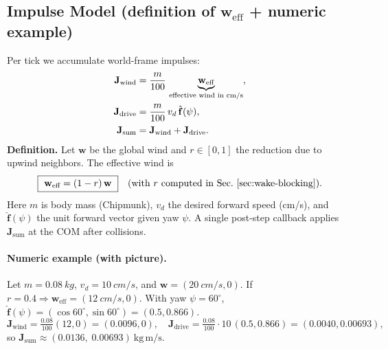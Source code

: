 \documentclass[11pt,a4paper]{article}
\newcommand{\vect}[1]{\mathbf{#1}}
\newcommand{\unitvect}[1]{\hat{\mathbf{#1}}}
\begin{document}
\subsection{Impulse Model (definition of \texorpdfstring{\(\vect{w}_{\mathrm{eff}}\)}{weff} + numeric example)}
Per tick we accumulate world-frame impulses:
\begin{align}
  \vect{J}_\text{wind}  &= \frac{m}{100}\,\underbrace{\vect{w}_\text{eff}}_{\text{effective wind in \si{cm/s}}},\\
  \vect{J}_\text{drive} &= \frac{m}{100}\,v_d\,\unitvect{f}(\psi),\\
  \vect{J}_\text{sum}   &= \vect{J}_\text{wind} + \vect{J}_\text{drive}.
\end{align}
\textbf{Definition.} Let \(\vect{w}\) be the global wind and \(r\in[0,1]\) the reduction due to upwind neighbors. The effective wind is
\[
  \boxed{\ \vect{w}_\text{eff} = (1-r)\,\vect{w}\ } \quad \text{(with \(r\) computed in Sec.~\ref{sec:wake-blocking}).}
\]
Here \(m\) is body mass (Chipmunk), \(v_d\) the desired forward speed (\si{cm/s}), and \(\unitvect{f}(\psi)\) the unit forward vector given yaw \(\psi\).
A single post-step callback applies \(\vect{J}_\text{sum}\) at the COM after collisions.

\paragraph{Numeric example (with picture).}
Let \(m=\SI{0.08}{kg}\), \(v_d=\SI{10}{cm/s}\), and \(\vect{w}=(\SI{20}{cm/s},0)\).
If \(r=0.4\Rightarrow \vect{w}_\text{eff}=(\SI{12}{cm/s},0)\).
With yaw \(\psi=60^\circ\), \(\unitvect{f}(\psi)=(\cos 60^\circ,\sin 60^\circ)=(0.5,0.866)\).
\[
\vect{J}_\text{wind}=\tfrac{0.08}{100}(12,0)=(0.0096,0),\quad
\vect{J}_\text{drive}=\tfrac{0.08}{100}\cdot10\,(0.5,0.866)=(0.0040,0.00693),
\]
so \(\boxed{\vect{J}_\text{sum}\approx(0.0136,\;0.00693)\ \mathrm{kg\,m/s}}\).
\end{document}
